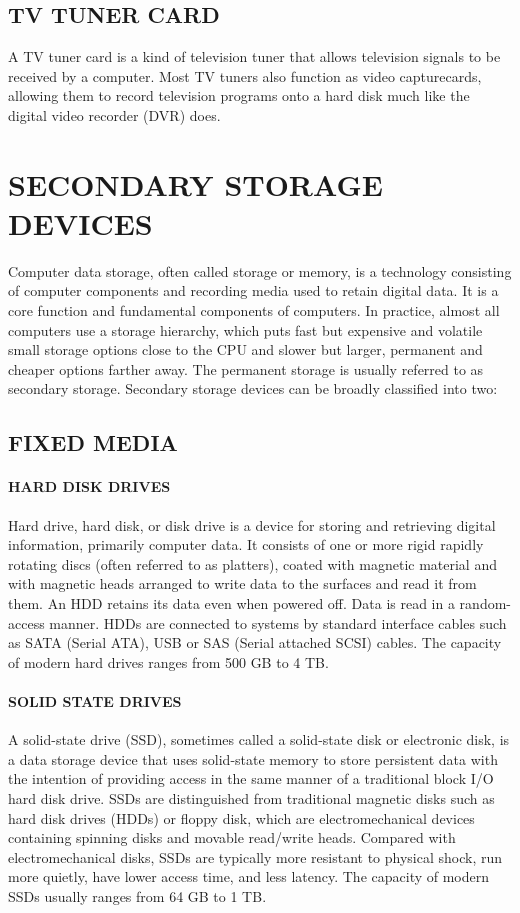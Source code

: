 \documentclass{article}
\begin{document}
\subsection{ TV TUNER CARD}
 A TV tuner card is a kind of television tuner that allows television signals to be received by
a computer. Most TV tuners also function as video capturecards, allowing them to record television
programs onto a hard disk much like the digital video recorder (DVR) does.
\section {SECONDARY STORAGE DEVICES}
Computer data storage, often called storage or memory, is a technology consisting of computer components
and recording media used to retain digital data. It is a core function and fundamental components of
computers. In practice, almost all computers use a storage hierarchy, which puts fast but expensive and volatile
small storage options close to the CPU and slower but larger, permanent and cheaper options farther away. The
permanent storage is usually referred to as secondary storage. Secondary storage devices can be broadly
classified into two:
\subsection {FIXED MEDIA}
\paragraph{ HARD DISK DRIVES}
  Hard drive, hard disk, or disk drive is a device for
storing and retrieving digital information, primarily computer data. It consists of one or more rigid rapidly rotating discs (often referred to as platters), coated with magnetic material and
with magnetic heads arranged to write data to the surfaces and read it from them. An HDD retains its
data even when powered off. Data is read in a random-access manner. HDDs are
connected to systems by standard interface cables such as SATA (Serial ATA), USB or SAS (Serial
attached SCSI) cables. The capacity of modern hard drives ranges from 500 GB to 4 TB.
\paragraph{ SOLID STATE DRIVES}
A solid-state drive (SSD), sometimes called a solid-state disk or electronic disk, is a
data storage device that uses solid-state memory to store persistent data with the intention of providing
access in the same manner of a traditional block I/O hard disk drive. SSDs are distinguished from
traditional magnetic disks such as hard disk drives (HDDs) or floppy disk, which are electromechanical
devices containing spinning disks and movable read/write heads. Compared with electromechanical
disks, SSDs are typically more resistant to physical shock, run more quietly, have lower access time,
and less latency. The capacity of modern
SSDs usually ranges from 64 GB to 1 TB.
\end{document}
